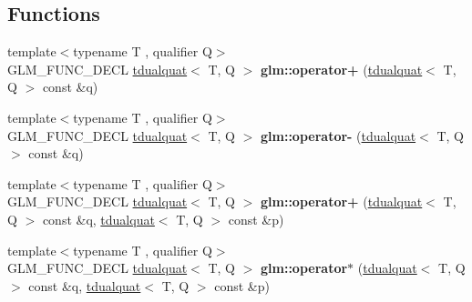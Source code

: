 \subsection*{Functions}
\begin{DoxyCompactItemize}
\item 
\mbox{\label{group__gtx__dual__quaternion_ga11a89ba9d2bc5ef4ab9bd77ac231fe63}} 
{\footnotesize template$<$typename T , qualifier Q$>$ }\\G\+L\+M\+\_\+\+F\+U\+N\+C\+\_\+\+D\+E\+CL \hyperlink{structglm_1_1tdualquat}{tdualquat}$<$ T, Q $>$ {\bfseries glm\+::operator+} (\hyperlink{structglm_1_1tdualquat}{tdualquat}$<$ T, Q $>$ const \&q)
\item 
\mbox{\label{group__gtx__dual__quaternion_ga2245f8ea1b7c8a3fccfc92ca97ef03de}} 
{\footnotesize template$<$typename T , qualifier Q$>$ }\\G\+L\+M\+\_\+\+F\+U\+N\+C\+\_\+\+D\+E\+CL \hyperlink{structglm_1_1tdualquat}{tdualquat}$<$ T, Q $>$ {\bfseries glm\+::operator-\/} (\hyperlink{structglm_1_1tdualquat}{tdualquat}$<$ T, Q $>$ const \&q)
\item 
\mbox{\label{group__gtx__dual__quaternion_ga55e10eaaabe1166be6314df62591c134}} 
{\footnotesize template$<$typename T , qualifier Q$>$ }\\G\+L\+M\+\_\+\+F\+U\+N\+C\+\_\+\+D\+E\+CL \hyperlink{structglm_1_1tdualquat}{tdualquat}$<$ T, Q $>$ {\bfseries glm\+::operator+} (\hyperlink{structglm_1_1tdualquat}{tdualquat}$<$ T, Q $>$ const \&q, \hyperlink{structglm_1_1tdualquat}{tdualquat}$<$ T, Q $>$ const \&p)
\item 
\mbox{\label{group__gtx__dual__quaternion_ga01828eee9e1cf1f56e4018fcdc910aa0}} 
{\footnotesize template$<$typename T , qualifier Q$>$ }\\G\+L\+M\+\_\+\+F\+U\+N\+C\+\_\+\+D\+E\+CL \hyperlink{structglm_1_1tdualquat}{tdualquat}$<$ T, Q $>$ {\bfseries glm\+::operator$\ast$} (\hyperlink{structglm_1_1tdualquat}{tdualquat}$<$ T, Q $>$ const \&q, \hyperlink{structglm_1_1tdualquat}{tdualquat}$<$ T, Q $>$ const \&p)
\item 
\mbox{\label{group__gtx__dual__quaternion_ga3489c5fcf23fd302ef3713f443585cbd}} 

\end{DoxyCompactItemize}
